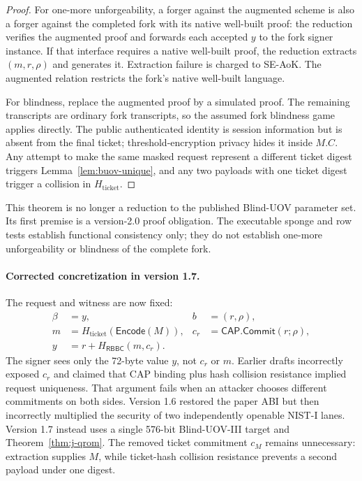 \documentclass[11pt]{article}
\newcommand{\RBBC}{\mathsf{RBBC}}
\begin{document}
\begin{proof}
For one-more unforgeability, a forger against the augmented scheme is also a
forger against the completed fork with its native well-built proof: the
reduction verifies the augmented proof and forwards each accepted $y$ to the
fork signer instance.  If that interface requires a native well-built proof,
the reduction extracts $(m,r,\rho)$ and generates it.  Extraction failure is
charged to SE-AoK.  The augmented relation restricts the fork's native
well-built language.

For blindness, replace the augmented proof by a simulated proof.  The remaining
transcripts are ordinary fork transcripts, so the assumed fork blindness game
applies directly.  The
public authenticated identity is session information but is absent from the
final ticket; threshold-encryption privacy hides it inside $M.C$.  Any attempt
to make the same masked request represent a different ticket digest triggers
Lemma~\ref{lem:buov-unique}, and any two payloads with one ticket digest trigger
a collision in $H_{\mathrm{ticket}}$.
\end{proof}

This theorem is no longer a reduction to the published Blind-UOV parameter
set.  Its first premise is a version-2.0 proof obligation.  The executable
sponge and row tests establish functional consistency only; they do not
establish one-more unforgeability or blindness of the complete fork.

\paragraph{Corrected concretization in version 1.7.}
The request and witness are now fixed:
\begin{align*}
 \beta&=y,& b&=(r,\rho),\\
 m&=H_{\mathrm{ticket}}(\mathsf{Encode}(M)),&
 c_r&=\mathsf{CAP.Commit}(r;\rho),\\
 y&=r+H_{\RBBC}(m,c_r).&&
\end{align*}
The signer sees only the 72-byte value $y$, not $c_r$ or $m$.
Earlier drafts incorrectly exposed $c_r$ and claimed that CAP binding plus hash
collision resistance implied request uniqueness.  That argument fails when an
attacker chooses different commitments on both sides.  Version 1.6 restored the
paper ABI but then incorrectly multiplied the security of two independently
openable NIST-I lanes.  Version 1.7 instead uses a single 576-bit
Blind-UOV-III target and Theorem~\ref{thm:j-qrom}.  The removed
ticket commitment $c_M$ remains unnecessary: extraction supplies $M$, while
ticket-hash collision resistance prevents a second payload under one digest.
\end{document}

